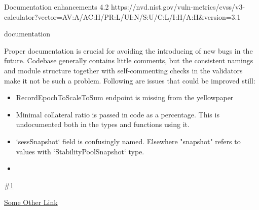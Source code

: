 \vuln
    { %
      Documentation enhancements
    }
    { %
      4.2
    }
    { %
      https://nvd.nist.gov/vuln-metrics/cvss/v3-calculator?vector=AV:A/AC:H/PR:L/UI:N/S:U/C:L/I:H/A:H&version=3.1
    }
    { %
    \item documentation
    }
    { %
    Proper documentation is crucial for avoiding the introducing of new bugs in the future.
Codebase generally contains little comments, but the consistent namings and module structure together with self-commenting checks in the validators make it not be such a problem.
Following are issues that could be improved still:
\begin{itemize}
    \item RecordEpochToScaleToSum endpoint is missing from the yellowpaper
    \item Minimal collateral ratio is passed in code as a percentage. This is undocumented both in the types and functions using it.
    \item `sessSnapshot` field is confusingly named. Elsewhere "snapshot" refers to values with `StabilityPoolSnapshot` type.
    \item 
  \end{itemize}
  
    }
    { %
      
    }
    { %
    \item\href{github.com}{\#1}
    \item\href{github.com}{Some Other Link}
    }
